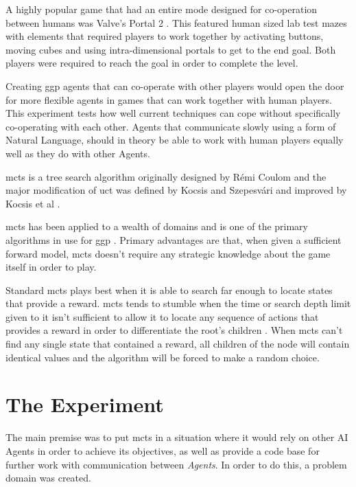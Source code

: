 \documentclass{IEEEtran}
\begin{document}
A highly popular game that had an entire mode designed for co-operation between humans was Valve's Portal 2 \cite{portal2}. This featured human sized lab test mazes with elements that required players to work together by activating buttons, moving cubes and using intra-dimensional portals to get to the end goal. Both players were required to reach the goal in order to complete the level.

Creating \gls{ggp} agents that can co-operate with other players would open the door for more flexible agents in games that can work together with human players. This experiment tests how well current techniques can cope without specifically co-operating with each other. Agents that communicate slowly using a form of Natural Language, should in theory be able to work with human players equally well as they do with other Agents.

\gls{mcts} is a tree search algorithm originally designed by R{\'e}mi Coulom \cite{coulom2007efficient} and the major modification of \gls{uct} was defined by Kocsis and Szepesv{\'a}ri \cite{kocsis2006bandit} and improved by Kocsis et al \cite{kocsis2006improved}.

\gls{mcts} \cite{browne2012survey} has been applied to a wealth of domains and is one of the primary algorithms in use for \gls{ggp} \cite{finnsson2008simulation}. Primary advantages are that, when given a sufficient forward model, \gls{mcts} doesn't require any strategic knowledge about the game itself in order to play.

Standard \gls{mcts} plays best when it is able to search far enough to locate states that provide a reward. \gls{mcts} tends to stumble when the time or search depth limit given to it isn't sufficient to allow it to locate any sequence of actions that provides a reward in order to differentiate the root's children \cite{perez2012monte}. When \gls{mcts} can't find any single state that contained a reward, all children of the node will contain identical values and the algorithm will be forced to make a random choice.

\section{The Experiment}
The main premise was to put \gls{mcts} in a situation where it would rely on other AI Agents in order to achieve its objectives, as well as provide a code base for further work with communication between \emph{Agents}. In order to do this, a problem domain was created.
\end{document}
